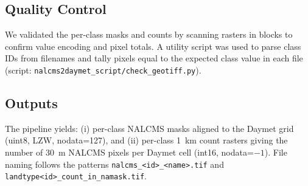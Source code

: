 \subsection{Quality Control}
We validated the per-class masks and counts by scanning rasters in blocks to confirm value encoding and pixel totals. A utility script was used to parse class IDs from filenames and tally pixels equal to the expected class value in each file (script: \texttt{nalcms2daymet\_script/check\_geotiff.py}).

\subsection{Outputs}
The pipeline yields: (i) per-class NALCMS masks aligned to the Daymet grid (uint8, LZW, nodata=127), and (ii) per-class 1~km count rasters giving the number of 30~m NALCMS pixels per Daymet cell (int16, nodata=\(-1\)). File naming follows the patterns \texttt{nalcms\_\textless id\textgreater\_\textless name\textgreater.tif} and \texttt{landtype\textless id\textgreater\_count\_in\_namask.tif}.

